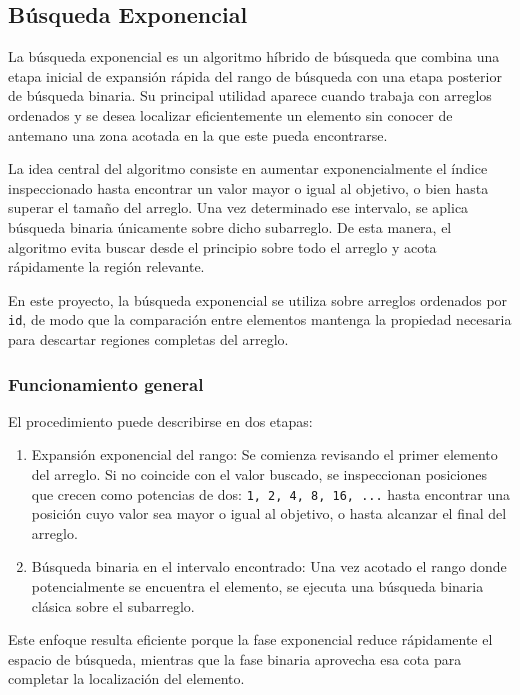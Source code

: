 \subsection{Búsqueda Exponencial}\label{sec:exponencial}
La búsqueda exponencial es un algoritmo híbrido de búsqueda que combina una etapa inicial de expansión rápida del rango de búsqueda con una etapa posterior de búsqueda binaria. Su principal utilidad aparece cuando trabaja con arreglos ordenados y se desea localizar eficientemente un elemento sin conocer de antemano una zona acotada en la que este pueda encontrarse.

La idea central del algoritmo consiste en aumentar exponencialmente el índice inspeccionado hasta encontrar un valor mayor o igual al objetivo, o bien hasta superar el tamaño del arreglo. Una vez determinado ese intervalo, se aplica búsqueda binaria únicamente sobre dicho subarreglo. De esta manera, el algoritmo evita buscar desde el principio sobre todo el arreglo y acota rápidamente la región relevante.

En este proyecto, la búsqueda exponencial se utiliza sobre arreglos ordenados por \texttt{id}, de modo que la comparación entre elementos mantenga la propiedad necesaria para descartar regiones completas del arreglo.

\subsubsection{Funcionamiento general}
El procedimiento puede describirse en dos etapas:
\begin{enumerate}
    \item Expansión exponencial del rango: Se comienza revisando el primer elemento del arreglo. Si no coincide con el valor buscado, se inspeccionan posiciones que crecen como potencias de dos: \texttt{1, 2, 4, 8, 16, ...} hasta encontrar una posición cuyo valor sea mayor o igual al objetivo, o hasta alcanzar el final del arreglo.
    \item Búsqueda binaria en el intervalo encontrado: Una vez acotado el rango donde potencialmente se encuentra el elemento, se ejecuta una búsqueda binaria clásica sobre el subarreglo.
\end{enumerate}
Este enfoque resulta eficiente porque la fase exponencial reduce rápidamente el espacio de búsqueda, mientras que la fase binaria aprovecha esa cota para completar la localización del elemento.

